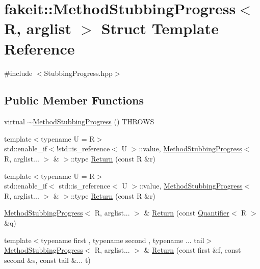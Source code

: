 \hypertarget{structfakeit_1_1MethodStubbingProgress}{}\section{fakeit\+::Method\+Stubbing\+Progress$<$ R, arglist $>$ Struct Template Reference}
\label{structfakeit_1_1MethodStubbingProgress}


{\ttfamily \#include $<$Stubbing\+Progress.\+hpp$>$}

\subsection*{Public Member Functions}
\begin{DoxyCompactItemize}
\item 
virtual \mbox{\hyperlink{structfakeit_1_1MethodStubbingProgress_aed2c96ce537706935976943354c49616}{$\sim$\+Method\+Stubbing\+Progress}} () T\+H\+R\+O\+WS
\item 
{\footnotesize template$<$typename U  = R$>$ }\\std\+::enable\+\_\+if$<$!std\+::is\+\_\+reference$<$ U $>$\+::value, \mbox{\hyperlink{structfakeit_1_1MethodStubbingProgress}{Method\+Stubbing\+Progress}}$<$ R, arglist... $>$ \& $>$\+::type \mbox{\hyperlink{structfakeit_1_1MethodStubbingProgress_ab97be63c322887db40cb788d28875fea}{Return}} (const R \&r)
\item 
{\footnotesize template$<$typename U  = R$>$ }\\std\+::enable\+\_\+if$<$ std\+::is\+\_\+reference$<$ U $>$\+::value, \mbox{\hyperlink{structfakeit_1_1MethodStubbingProgress}{Method\+Stubbing\+Progress}}$<$ R, arglist... $>$ \& $>$\+::type \mbox{\hyperlink{structfakeit_1_1MethodStubbingProgress_ab20141c6f552c3aa3399660c520c2ba4}{Return}} (const R \&r)
\item 
\mbox{\hyperlink{structfakeit_1_1MethodStubbingProgress}{Method\+Stubbing\+Progress}}$<$ R, arglist... $>$ \& \mbox{\hyperlink{structfakeit_1_1MethodStubbingProgress_acb4d4db8208a8eaadff77e7cbf3775db}{Return}} (const \mbox{\hyperlink{structfakeit_1_1Quantifier}{Quantifier}}$<$ R $>$ \&q)
\item 
{\footnotesize template$<$typename first , typename second , typename ... tail$>$ }\\\mbox{\hyperlink{structfakeit_1_1MethodStubbingProgress}{Method\+Stubbing\+Progress}}$<$ R, arglist... $>$ \& \mbox{\hyperlink{structfakeit_1_1MethodStubbingProgress_ae8417ec5f29f70be1ae914755b05e4db}{Return}} (const first \&f, const second \&s, const tail \&... t)

\end{DoxyCompactItemize}
